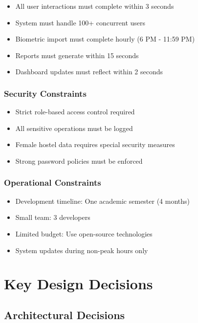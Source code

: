 \documentclass[12pt]{article}
\begin{document}
\begin{itemize}
\item All user interactions must complete within 3 seconds
\item System must handle 100+ concurrent users
\item Biometric import must complete hourly (6 PM - 11:59 PM)
\item Reports must generate within 15 seconds
\item Dashboard updates must reflect within 2 seconds
\end{itemize}

\subsubsection{Security Constraints}

\begin{itemize}
\item Strict role-based access control required
\item All sensitive operations must be logged
\item Female hostel data requires special security measures
\item Strong password policies must be enforced
\end{itemize}

\subsubsection{Operational Constraints}

\begin{itemize}
\item Development timeline: One academic semester (4 months)
\item Small team: 3 developers
\item Limited budget: Use open-source technologies
\item System updates during non-peak hours only
\end{itemize}

\newpage
\section{Key Design Decisions}

\subsection{Architectural Decisions}
\end{document}
